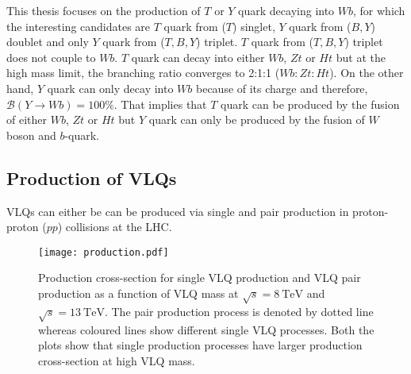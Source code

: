 This thesis focuses on the production of $T$ or $Y$ quark decaying into $Wb$, for which the interesting candidates are $T$ quark from ($T$) singlet, $Y$ quark from ($B, Y$) doublet and only $Y$ quark from ($T, B, Y$) triplet. $T$ quark from ($T, B, Y$) triplet does not couple to $Wb$. $T$ quark can decay into either $Wb$, $Zt$ or $Ht$ but at the high mass limit, the branching ratio converges to 2:1:1 ($Wb: Zt: Ht$). On the other hand, $Y$ quark can only decay into $Wb$ because of its charge and therefore, $\mathcal{B}(Y \rightarrow Wb) = 100\%$. That implies that $T$ quark can be produced by the fusion of either $Wb$, $Zt$ or $Ht$ but $Y$ quark can only be produced by the fusion of $W$ boson and $b$-quark.


\subsection{Production of VLQs}%
\label{sec:theory:production}

VLQs can either be can be produced via single and pair production in proton-proton ($pp$) collisions at the LHC. 

\begin{figure}[hbt!]
	\centering
	\texttt{[image: production.pdf]}
	\caption{Production cross-section for single VLQ production and VLQ pair production as a function of VLQ mass at $\sqrt{s}=\SI{8}{\tera\electronvolt}$ and $\sqrt{s}=\SI{13}{\tera\electronvolt}$. The pair production process is denoted by dotted line whereas coloured lines show different single VLQ processes. Both the plots show that single production processes have larger production cross-section at high VLQ mass.~\cite{aguilar}}
	\label{fig:theory:production}
\end{figure}

